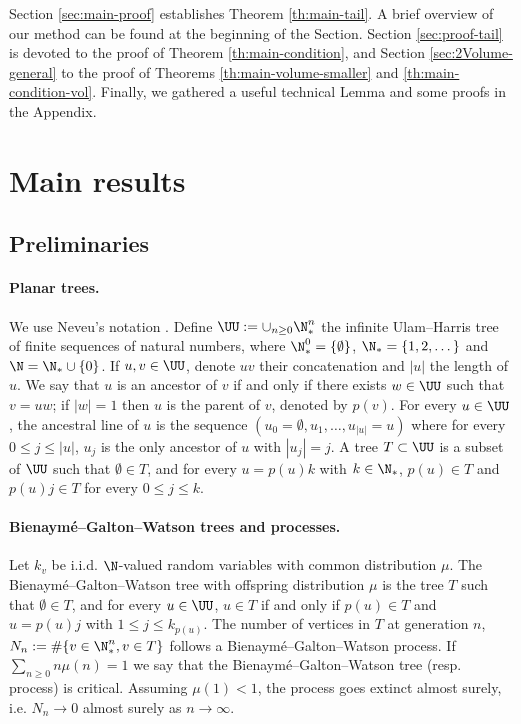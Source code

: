 \documentclass[10pt,a4paper]{article}
\begin{document}
Section \ref{sec:main-proof} establishes Theorem \ref{th:main-tail}. A brief overview of our method can be found at the beginning of the Section. Section \ref{sec:proof-tail} is devoted to the proof of Theorem \ref{th:main-condition}, and Section \ref{sec:2Volume-general} to the proof of Theorems \ref{th:main-volume-smaller} and \ref{th:main-condition-vol}. Finally, we gathered a useful technical Lemma and some proofs in the Appendix. 




\section{Main results}

\subsection{Preliminaries}
\label{sec:preliminaries}


\paragraph{Planar trees.}

We use Neveu's notation \cite{neveu1986arbres}. Define $\UU := \cup_{n\geq 0} \N_*^n$ the infinite Ulam--Harris tree of finite sequences of natural numbers, where $\N_*^0 = \{\emptyset\}$, $\N_* = \{1, 2, \dots\}$ and $\N = \N_* \cup \{0\}$. If $u,v \in \UU$, denote $uv$ their concatenation and $|u|$ the length of $u$. We say that $u$ is an ancestor of $v$ if and only if there exists $w\in\UU$ such that $v = uw$; if $|w|=1$ then $u$ is the parent of $v$, denoted by $p(v)$. For every $u\in \UU$, the ancestral line of $u$ is the sequence $(u_0 = \emptyset, u_1, \dots, u_{|u|} = u)$ where for every $0\leq j \leq |u|$, $u_j$ is the only ancestor of $u$ with $|u_j|=j$. A tree $T \subset \UU$ is a subset of $\UU$ such that $\emptyset \in T$, and for every $u = p(u)k$ with $k\in \N_*$, $p(u) \in T$ and $p(u) j \in T$ for every $0\leq j \leq k$. 

\paragraph{Bienaymé--Galton--Watson trees and processes.} 
Let $k_v$ be i.i.d. $\N$-valued random variables with common distribution $\mu$. The Bienaymé--Galton--Watson tree with offspring distribution $\mu$ is the tree $T$ such that $\emptyset \in T$, and for every $u\in \UU$, $u \in T$ if and only if $p(u)\in T$ and $u = p(u)j$ with $1\leq j \leq k_{p(u)}$. The number of vertices in $T$ at generation $n$, $N_n := \#\{ v \in \N_*^n, v\in T\}$ follows a Bienaymé--Galton--Watson process. If $\sum_{n\geq 0} n \mu(n) = 1$ we say that the Bienaymé--Galton--Watson tree (resp. process) is critical. Assuming $\mu(1) < 1$, the process goes extinct almost surely, i.e. $N_n \to 0$ almost surely as $n\to\infty$. 
\end{document}
